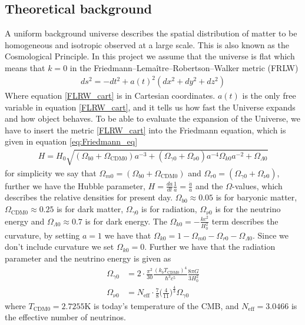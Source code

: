 \documentclass{aa}
\begin{document}
\subsection{Theoretical background}
A uniform background universe describes the spatial distribution of matter to be homogeneous and isotropic observed at a large scale. This is also known as the Cosmological Principle. In this project we assume that the universe is flat which means that $k=0$ in the Friedmann–Lemaître–Robertson–Walker metric (FRLW)
\begin{align}
    ds^2 =-dt^2+a(t)^2(dx^2+dy^2+dz^2)\label{FLRW_cart}
\end{align}
Where equation \eqref{FLRW_cart} is in Cartesian coordinates. $a(t)$ is the only free variable in equation \eqref{FLRW_cart}, and it tells us how fast the Universe expands and how object behaves. To be able to evaluate the expansion of the Universe, we have to insert the metric \eqref{FLRW_cart} into the Friedmann equation, which is given in equation \eqref{eq:Friedmann_eq}
\begin{align}
    H=H_0\sqrt{(\Omega_{b0}+\Omega_{\text{CDM}0})a^{-3}+(\Omega_{\gamma0}+\Omega_{\nu0})a^{-4}\Omega_{k0}a^{-2}+\Omega_{\Lambda0}} \label{eq:Friedmann_eq}
\end{align}
for simplicity we say that $\Omega_{m0}=(\Omega_{b0}+\Omega_{\text{CDM}0})$ and $\Omega_{r0}=(\Omega_{\gamma0}+\Omega_{\nu0})$, further we
have the Hubble parameter, $H=\frac{da}{dt}\frac{1}{a}=\frac{\Dot{a}}{a}$ and the $\Omega$-values, which describes the relative densities for present day. $\Omega_{b0}\approx 0.05$ is for baryonic matter, $\Omega_{\text{CDM}0}\approx 0.25$ is for dark matter, $\Omega_{\gamma0}$ is for radiation, $\Omega_{\nu0}$ is for the neutrino energy and $\Omega_{\Lambda 0}\approx 0.7$ is for dark energy. The $\Omega_{k0}=-\frac{kc^2}{H_0^2}$ term describes the curvature, by setting $a=1$ we have that $\Omega_{k0}=1-\Omega_{m0}-\Omega_{r0}-\Omega_{\Lambda0}$. Since we don't include curvature we set $\Omega_{k0}=0$. 
Further we have that the radiation parameter and the neutrino energy is given as 
\begin{align}
    \Omega_{\gamma0}&= 2\cdot \frac{\pi^2}{30}\frac{(k_bT_{\text{CDM}0})^4}{\hbar^3c^5}\frac{8\pi G}{3H_0^2}\\
    \Omega_{\nu0}&=N_\text{eff}\cdot\frac{7}{8}\bigg(\frac{4}{11}\bigg)^\frac{4}{3}\Omega_{\gamma0}
\end{align}
where $T_{\text{CDM}0}=2.7255$K is today's temperature of the CMB, and $N_\text{eff}=3.0466$ is the effective number of neutrinos. \\
\end{document}
